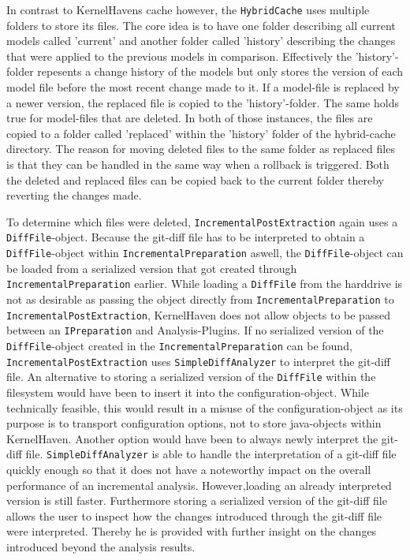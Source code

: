 \documentclass[a4paper]{article}
\begin{document}
 In contrast to KernelHavens cache however, the \texttt{Hybrid\-Cache} uses multiple folders to store its files. The core idea is to have one folder describing all current models called 'current' and another folder called 'history' describing the changes that were applied to the previous models in comparison. Effectively the 'history'-folder repesents a change history of the models but only stores the version of each model file before the most recent change made to it. 
 If a model-file is replaced by a newer version, the replaced file is copied to the 'history'-folder. The same holds true for model-files that are deleted. In both of those instances, the files are copied to a folder called 'replaced' within the 'history' folder of the hybrid-cache directory. The reason for moving deleted files to the same folder as replaced files is that they can be handled in the same way when a rollback is triggered. Both the deleted and replaced files can be copied back to the current folder thereby reverting the changes made.
 
To determine which files were deleted, \texttt{Incremental\-Post\-Extraction} again uses a \texttt{DiffFile}-object. Because the git-diff file has to be interpreted to obtain a \texttt{DiffFile}-object within \texttt{Incremental\-Preparation} aswell, the \texttt{DiffFile}-object can be loaded from a serialized version that got created through \texttt{Incremental\-Preparation} earlier. While loading a \texttt{DiffFile} from the harddrive is not as desirable as passing the object directly from \texttt{Incremental\-Preparation} to \texttt{Incremental\-Post\-Extraction}, KernelHaven does not allow objects to be passed between an \texttt{IPreparation} and Analysis-Plugins. If no serialized version of the \texttt{DiffFile}-object created in the \texttt{Incremental\-Preparation} can be found, \texttt{Incremental\-Post\-Extraction} uses \texttt{Simple\-Diff\-Analyzer} to interpret the git-diff file. An alternative to storing a serialized version of the \texttt{DiffFile} within the filesystem would have been to insert it into the configuration-object. While technically feasible, this would result in a misuse of the configuration-object as its purpose is to transport configuration options, not to store java-objects within KernelHaven. Another option would have been to always newly interpret the git-diff file. \texttt{Simple\-Diff\-Analyzer} is able to handle the interpretation of a git-diff file quickly enough so that it does not have a noteworthy impact on the overall performance of an incremental analysis. However,loading an already interpreted version is still faster. Furthermore storing a serialized version of the git-diff file allows the user to inspect how the changes introduced through the git-diff file were interpreted. Thereby he is provided with further insight on the changes introduced beyond the analysis results.
 
\end{document}
